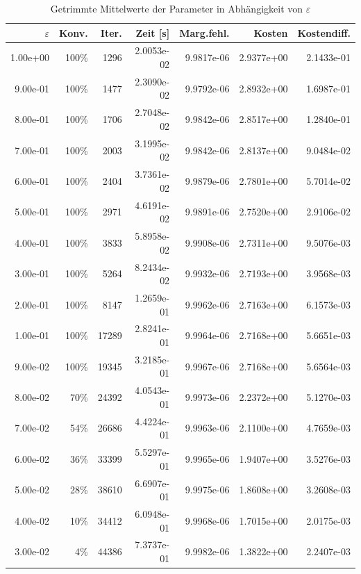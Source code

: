 \begin{table}[htbp]
\caption{Getrimmte Mittelwerte der Parameter in Abhängigkeit von $\varepsilon$}
\label{tab:Parametertest128_1_Seed50}
\small
\centering
{}
\begin{tabular}{rrrrrrr}
\toprule
$\varepsilon$ & Konv. & Iter. & Zeit [s] & Marg.fehl. & Kosten & Kostendiff. \\
\midrule
1.00e+00 & 100\% & 1296 & 2.0053e-02 & 9.9817e-06 & 2.9377e+00 & 2.1433e-01 \\
9.00e-01 & 100\% & 1477 & 2.3090e-02 & 9.9792e-06 & 2.8932e+00 & 1.6987e-01 \\
8.00e-01 & 100\% & 1706 & 2.7048e-02 & 9.9842e-06 & 2.8517e+00 & 1.2840e-01 \\
7.00e-01 & 100\% & 2003 & 3.1995e-02 & 9.9842e-06 & 2.8137e+00 & 9.0484e-02 \\
6.00e-01 & 100\% & 2404 & 3.7361e-02 & 9.9879e-06 & 2.7801e+00 & 5.7014e-02 \\
5.00e-01 & 100\% & 2971 & 4.6191e-02 & 9.9891e-06 & 2.7520e+00 & 2.9106e-02 \\
4.00e-01 & 100\% & 3833 & 5.8958e-02 & 9.9908e-06 & 2.7311e+00 & 9.5076e-03 \\
3.00e-01 & 100\% & 5264 & 8.2434e-02 & 9.9932e-06 & 2.7193e+00 & 3.9568e-03 \\
2.00e-01 & 100\% & 8147 & 1.2659e-01 & 9.9962e-06 & 2.7163e+00 & 6.1573e-03 \\
1.00e-01 & 100\% & 17289 & 2.8241e-01 & 9.9964e-06 & 2.7168e+00 & 5.6651e-03 \\
9.00e-02 & 100\% & 19345 & 3.2185e-01 & 9.9967e-06 & 2.7168e+00 & 5.6564e-03 \\
8.00e-02 & 70\% & 24392 & 4.0543e-01 & 9.9973e-06 & 2.2372e+00 & 5.1270e-03 \\
7.00e-02 & 54\% & 26686 & 4.4224e-01 & 9.9963e-06 & 2.1100e+00 & 4.7659e-03 \\
6.00e-02 & 36\% & 33399 & 5.5297e-01 & 9.9965e-06 & 1.9407e+00 & 3.5276e-03 \\
5.00e-02 & 28\% & 38610 & 6.6907e-01 & 9.9975e-06 & 1.8608e+00 & 3.2608e-03 \\
4.00e-02 & 10\% & 34412 & 6.0948e-01 & 9.9968e-06 & 1.7015e+00 & 2.0175e-03 \\
3.00e-02 & 4\% & 44386 & 7.3737e-01 & 9.9982e-06 & 1.3822e+00 & 2.2407e-03 \\
\bottomrule
\end{tabular}
\end{table}
